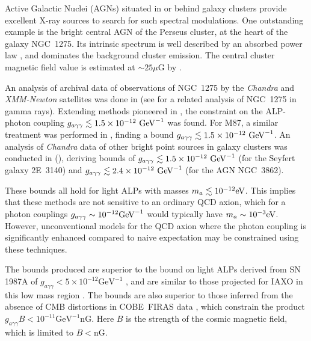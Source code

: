 \documentclass[fleqn,usenatbib,useAMS]{mnras}
\begin{document}
Active Galactic Nuclei (AGNs) situated in or behind galaxy clusters provide excellent X-ray sources to search for such spectral modulations. One outstanding example is the bright central AGN of the Perseus cluster, at the heart of the galaxy NGC~1275.
Its intrinsic spectrum is well described by an absorbed power law \citep{Churazov:2003hr,Yamazaki, Balmaverde2006, Fabian:2015kua}, and dominates the background cluster emission. The central cluster magnetic field value is estimated at $ \sim 25 \mu$G by \citep{0602622}.

An analysis of archival data of observations of NGC~1275 by the {\it Chandra} and {\it XMM-Newton} satellites was done in \citep{Berg:2016ese}
(see \citep{1603.06978} for a related analysis of NGC~1275 in gamma rays).
Extending methods pioneered in \citep{1304.0989}, the constraint on the ALP-photon coupling ${g_{a\gamma\gamma} \lesssim 1.5 \times 10^{-12}~{\rm GeV}^{-1}}$ was found. For M87, a similar treatment was performed in \citep{Marsh:2017yvc}, finding a
bound ${g_{a\gamma\gamma} \lesssim 1.5 \times 10^{-12}~{\rm GeV}^{-1}}$. An analysis of {\it Chandra} data of other bright point sources in galaxy clusters was conducted in (\citep{Conlon:2017qcw}), deriving bounds of ${g_{a\gamma\gamma} \lesssim 1.5 \times 10^{-12}~{\rm GeV}^{-1}}$ (for the Seyfert galaxy 2E~3140) and ${g_{a\gamma\gamma} \lesssim 2.4 \times 10^{-12}~{\rm GeV}^{-1}}$ (for the AGN NGC~3862).


These bounds all hold for light ALPs with masses $m_a \lesssim 10^{-12} {\rm eV}$. This implies that these methods are not sensitive
to an ordinary QCD axion, which for a photon couplings $g_{a\gamma\gamma} \sim 10^{-12} {\rm GeV}^{-1}$ would typically have $m_a \sim 10^{-3} {\rm eV}$. However, unconventional models for the QCD axion where the photon coupling is significantly enhanced compared to naive expectation may
be constrained using these techniques.

The bounds produced are superior to the bound on light ALPs derived from SN 1987A of $g_{a \gamma \gamma} < 5 \times 10^{-12} \text{GeV}^{-1}$ \citep{Payez:2014xsa}, and are similar to those projected for IAXO in this low mass region \citep{Irastorza:2012qf}. The bounds are also superior to those inferred from the absence of CMB distortions in \mbox{COBE FIRAS} data \citep{Mirizzi:2009nq}, which constrain the product $g_{a \gamma \gamma} B < 10^{-11} \text{GeV}^{-1} \text{nG}$. Here $B$ is the strength of the cosmic magnetic field, which is limited to $B<\text{nG}$.
\end{document}
